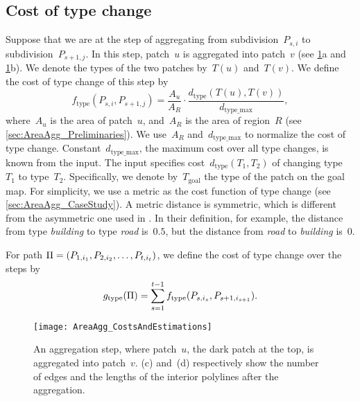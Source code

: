 \documentclass[acmsmall,natbib=false]{acmart}
\begin{document}
\subsection{Cost of type change}
\label{sec:AreaAgg_f_type}

Suppose that we are at the step of aggregating 
from subdivision~$P_{s,i}$ to subdivision~$P_{s+1,j}$. 
In this step, patch~$u$ is aggregated into patch~$v$
(see \figs\ref{fig:AreaAgg_FirstStep}a 
and \ref{fig:AreaAgg_FirstStep}b).
We denote the types of the two patches by~$T(u)$ and~$T(v)$. 
We define the cost of type change of this step by
\begin{equation}
\label{eq:f_type}
f_\mathrm{type}(P_{s,i},P_{s+1,j})=\frac{A_{u}}{A_R}
\cdot
\frac{d_\mathrm{type}(T(u),T(v))}{d_\mathrm{type\_max}},
\end{equation}
where~$A_u$ is the area of patch~$u$, 
and~$A_R$ is the area of region~$R$
(see \sect\ref{sec:AreaAgg_Preliminaries}).
We use~$A_R$ and~$d_\mathrm{type\_max}$ 
to normalize the cost of type change. 
Constant~$d_\mathrm{type\_max}$, the maximum cost over all type changes,  
is known from the input. 
The input specifies
cost~$d_\mathrm{type}(T_1,T_2)$ of changing type~$T_1$ to type~$T_2$.
Specifically, we denote by~$T_\mathrm{goal}$ the type of 
the patch on the goal map.
For simplicity, we use a metric 
as the cost function of type change
(see \sect\ref{sec:AreaAgg_CaseStudy}).
A metric distance is symmetric, 
which is different from the asymmetric one used in
\textcite{Dilo2009tGAP}.
In their definition, for example, 
the distance from type \emph{building} to type \emph{road} is~$0.5$,
but the distance from \emph{road} to \emph{building} is~$0$.

For path $\Pi=(P_{1,i_1}, P_{2,i_2}, \dots, 
P_{t,i_{t}})$,
we define the cost of type change over the steps by
\begin{equation}
\label{eq:g_type}
g_\mathrm{type}(\Pi)=
\sum_{s=1}^{t-1}f_\mathrm{type}(P_{s,i_s},P_{s+1,i_{s+1}}).
\end{equation}

\begin{figure}[tb]
\centering
\texttt{[image: AreaAgg\_CostsAndEstimations]}
\caption{An aggregation step, 
	where patch~$u$, the dark patch at the top,
	is aggregated into patch~$v$.
	\figs(c) and~(d) respectively show the number of 
	edges and the lengths of the interior polylines after 
	the aggregation.}
\label{fig:AreaAgg_FirstStep}	
\end{figure}
\end{document}

